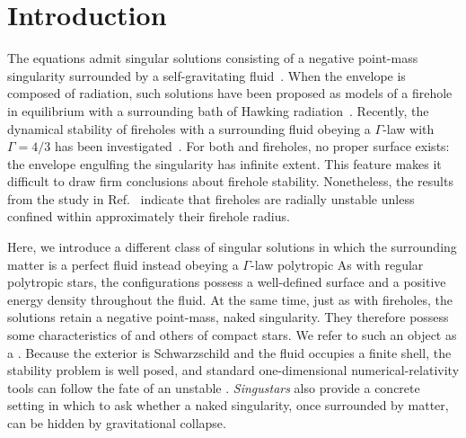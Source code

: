 \documentclass[%
 reprint,
 amsmath,amssymb,
 aps,prd,
 superscriptaddress,
]{revtex4-2}
\begin{document}
\section{Introduction}
\label{sec:intro}

The \tov{} equations admit singular solutions consisting of a negative point-mass singularity surrounded by a self-gravitating fluid~\cite{anastopoulos}. When the envelope is composed of radiation, such solutions have been proposed as models of a \bh{} firehole in equilibrium with a surrounding bath of Hawking radiation~\cite{Zurek,t_hooft}. Recently, the dynamical stability of \tov{} fireholes with a surrounding fluid obeying a $\Gamma$-law \eos{} with $\Gamma=4/3$ has been investigated~\cite{laguna2026}. For both \bh{} and \tov{} fireholes, no proper surface exists: the envelope engulfing the singularity has infinite extent. This feature makes it difficult to draw firm conclusions about firehole stability. Nonetheless, the results from the study in Ref.~\cite{laguna2026} indicate that \tov{} fireholes are radially unstable unless confined within
approximately their firehole radius.

Here, we introduce a different class of singular solutions in which the surrounding matter is a perfect fluid instead obeying a $\Gamma$-law polytropic  As with regular polytropic stars, the configurations possess a well-defined surface and a positive energy density throughout the fluid. At the same time, just as with fireholes, the solutions retain a negative point-mass, naked singularity. They therefore possess some characteristics of  and others of compact stars. We refer to such an object as a \singu{}. Because the exterior is Schwarzschild and the fluid occupies a finite shell, the stability problem is well posed, and standard one-dimensional numerical-relativity tools can follow the fate of an unstable \singu{}. \emph{Singustars} also provide a concrete setting in which to ask whether a naked singularity, once surrounded by matter, can be hidden by gravitational collapse.
\end{document}
